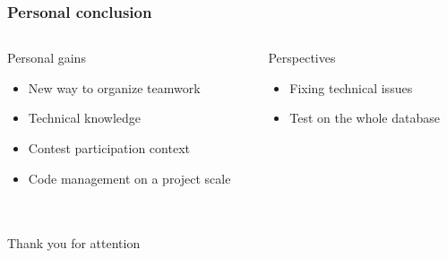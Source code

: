 \documentclass[xcolor=table]{beamer}
\begin{document}
\begin{frame}\frametitle{Personal conclusion}
\begin{columns}[t]
  \begin{column}{5cm}
    \begin{block}{Personal gains}
      \begin{itemize}
            \item New way to organize teamwork
            \item Technical knowledge
            \item Contest participation context
            \item Code management on a project scale
      \end{itemize}
    \end{block}
  \end{column}

  \begin{column}{5cm}
  \begin{block}{Perspectives}
  \begin{itemize}
        \item Fixing technical issues
        \item Test on the whole database
  \end{itemize}
  \end{block}
  \end{column}
\end{columns}


\end{frame}


\section{}
\begin{frame}\frametitle{}
    \begin{center}
        \huge Thank you for attention
    \end{center}
\end{frame}
\end{document}
